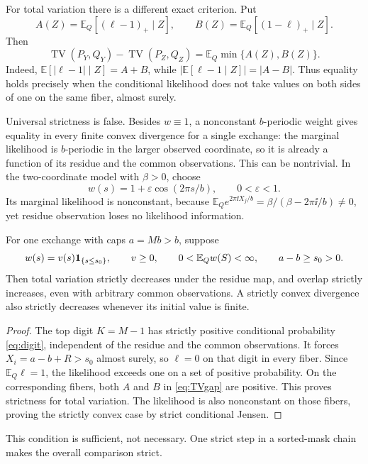 \documentclass[11pt,a4paper]{article}
\theoremstyle{remark}\newtheorem*{ednote}{Editorial note (ProveIt, 2026-10-01)}
\newcommand{\E}{\mathbb E}\newcommand{\N}{\mathbb N}\newcommand{\R}{\mathbb R}
\newcommand{\TV}{\operatorname{TV}}\newcommand{\KL}{\operatorname{KL}}
\begin{document}
For total variation there is a different exact criterion. Put
\[
 A(Z)=\E_Q[(\ell-1)_+\mid Z],\qquad
 B(Z)=\E_Q[(1-\ell)_+\mid Z].
\]
Then
\begin{equation}\label{eq:TVgap}
 \TV(P_Y,Q_Y)-\TV(P_Z,Q_Z)=\E_Q\min\{A(Z),B(Z)\}.
\end{equation}
Indeed, $\E[|\ell-1|\mid Z]=A+B$, while
$|\E[\ell-1\mid Z]|=|A-B|$. Thus equality holds precisely when the conditional likelihood does not take values on both sides of one on the same fiber, almost surely.

Universal strictness is false. Besides $w\equiv1$, a nonconstant $b$-periodic weight gives equality in every finite convex divergence for a single exchange: the marginal likelihood is $b$-periodic in the larger observed coordinate, so it is already a function of its residue and the common observations. This can be nontrivial. In the two-coordinate model with $\beta>0$, choose
\[
 w(s)=1+\varepsilon\cos(2\pi s/b),\qquad0<\varepsilon<1.
\]
Its marginal likelihood is nonconstant, because
$\E_Qe^{2\pi\ii X_j/b}=\beta/(\beta-2\pi\ii/b)\ne0$, yet residue observation loses no likelihood information.

\begin{proposition}\label{prop:strict}
For one exchange with caps $a=Mb>b$, suppose
\[
 w(s)=v(s)\ind_{\{s\le s_0\}},\qquad v\ge0,\qquad
 0<\E_Qw(S)<\infty,\qquad a-b\ge s_0>0.
\]
Then total variation strictly decreases under the residue map, and overlap strictly increases, even with arbitrary common observations. A strictly convex divergence also strictly decreases whenever its initial value is finite.
\end{proposition}
\begin{proof}
The top digit $K=M-1$ has strictly positive conditional probability \eqref{eq:digit}, independent of the residue and the common observations. It forces $X_i=a-b+R>s_0$ almost surely, so $\ell=0$ on that digit in every fiber. Since $\E_Q\ell=1$, the likelihood exceeds one on a set of positive probability. On the corresponding fibers, both $A$ and $B$ in \eqref{eq:TVgap} are positive. This proves strictness for total variation. The likelihood is also nonconstant on those fibers, proving the strictly convex case by strict conditional Jensen.
\end{proof}
This condition is sufficient, not necessary. One strict step in a sorted-mask chain makes the overall comparison strict.
\end{document}
